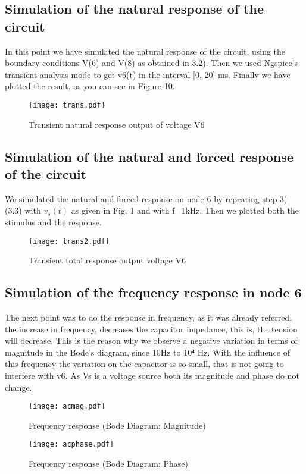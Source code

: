 \subsection{Simulation of the natural response of the circuit}

In this point we have simulated the natural response of the circuit, using the boundary conditions V(6) and V(8) as obtained in 3.2). Then we used Ngspice’s transient analysis mode to get v6(t) in the interval [0, 20] ms. Finally we have plotted the result, as you can see in Figure 10.

\begin{figure}[h] \centering
\texttt{[image: trans.pdf]}
\caption{Transient natural response output of voltage V6}
\label{fig:trans}
\end{figure}

\subsection{Simulation of the natural and forced response of the circuit}


We simulated the natural and forced response on node 6 by repeating step  3) (3.3) with $v_s(t)$ as given in Fig. 1 and with f=1kHz. Then we plotted both the stimulus and the response.

\begin{figure}[h] \centering
\texttt{[image: trans2.pdf]}
\caption{Transient total response output voltage V6}
\label{fig:trans2}
\end{figure}

\newpage
\subsection{Simulation of the frequency response in node 6 } 

The next point was to do the response in frequency, as it was already referred, the increase in frequency, decreases the capacitor impedance, this is, the tension will decrease. This is the reason why we observe a negative variation in terms of magnitude in the Bode's diagram, since 10Hz to 10⁴ Hz. With the influence of this frequency the variation on the capacitor is so small, that is not going to interfere with v6. As Vs is a voltage source both its magnitude and phase do not change.


\begin{figure}[h] \centering
\texttt{[image: acmag.pdf]}
\caption{Frequency response (Bode Diagram: Magnitude)}
\label{fig:acp}
\end{figure}
\begin{figure}[h] \centering
\texttt{[image: acphase.pdf]}
\caption{Frequency response (Bode Diagram: Phase)}
\label{fig:acp}
\end{figure}

\newpage




